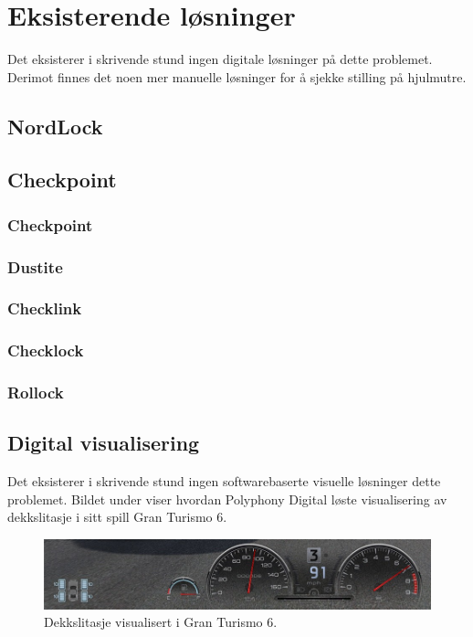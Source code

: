 \section{Eksisterende løsninger}
Det eksisterer i skrivende stund ingen digitale løsninger på dette problemet. 
Derimot finnes det noen mer manuelle løsninger for å sjekke stilling på hjulmutre.
\subsection{NordLock}
\subsection{Checkpoint}
\cite{checkpoint1}
\subsubsection{Checkpoint}
\subsubsection{Dustite}
\subsubsection{Checklink}
\subsubsection{Checklock}
\subsubsection{Rollock}
\cite{rolllock}

\subsection{Digital visualisering}
Det eksisterer i skrivende stund ingen softwarebaserte visuelle løsninger dette 
problemet. Bildet under viser hvordan Polyphony Digital løste visualisering av 
dekkslitasje i sitt spill Gran Turismo 6.\cite{dekkslitasje-GT6} 
	\newline
	\begin{figure}[H]
		\centering
		\includegraphics[width=1.00\textwidth]{images/gran-turismo-6-screenshot.jpg}
		\caption{Dekkslitasje visualisert i Gran Turismo 6.}
	\end{figure}
